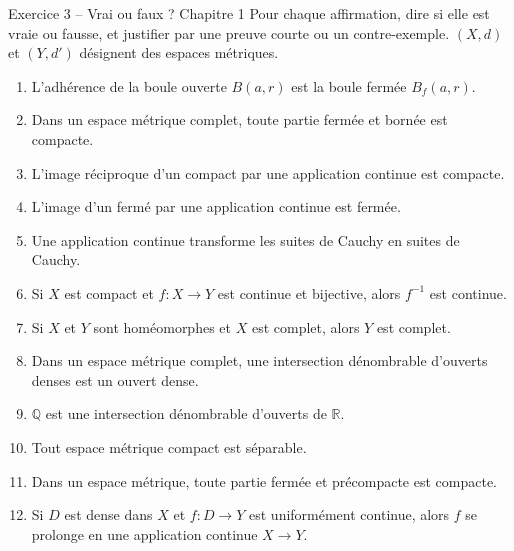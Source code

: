 \documentclass[11pt,a4paper]{article}
\newcommand{\R}{\mathbb{R}}
\newcommand{\Q}{\mathbb{Q}}
\newcommand{\Bf}{B_f}
\theoremstyle{definition}
\begin{document}
\begin{exo}{Exercice 3 -- Vrai ou faux ? Chapitre 1}
Pour chaque affirmation, dire si elle est vraie ou fausse, et justifier par une preuve courte ou un contre-exemple. $(X,d)$ et $(Y,d')$ désignent des espaces métriques.
\begin{enumerate}[label=\arabic*.]
  \item L'adhérence de la boule ouverte $B(a,r)$ est la boule fermée $\Bf(a,r)$.
  \item Dans un espace métrique complet, toute partie fermée et bornée est compacte.
  \item L'image réciproque d'un compact par une application continue est compacte.
  \item L'image d'un fermé par une application continue est fermée.
  \item Une application continue transforme les suites de Cauchy en suites de Cauchy.
  \item Si $X$ est compact et $f:X\to Y$ est continue et bijective, alors $f^{-1}$ est continue.
  \item Si $X$ et $Y$ sont homéomorphes et $X$ est complet, alors $Y$ est complet.
  \item Dans un espace métrique complet, une intersection dénombrable d'ouverts denses est un ouvert dense.
  \item $\Q$ est une intersection dénombrable d'ouverts de $\R$.
  \item Tout espace métrique compact est séparable.
  \item Dans un espace métrique, toute partie fermée et précompacte est compacte.
  \item Si $D$ est dense dans $X$ et $f:D\to Y$ est uniformément continue, alors $f$ se prolonge en une application continue $X\to Y$.
\end{enumerate}
\end{exo}
\end{document}
